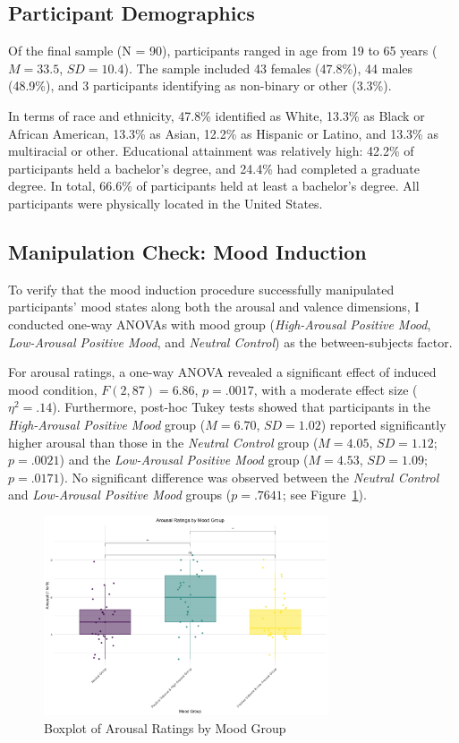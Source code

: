 \documentclass[../MA_Thesis.tex]{subfiles}
\begin{document}
\subsection*{Participant Demographics}

Of the final sample (N = 90), participants ranged in age from 19 to 65 years ($M = 33.5$, $SD = 10.4$). The sample included 43 females (47.8\%), 44 males (48.9\%), and 3 participants identifying as non-binary or other (3.3\%). 

In terms of race and ethnicity, 47.8\% identified as White, 13.3\% as Black or African American, 13.3\% as Asian, 12.2\% as Hispanic or Latino, and 13.3\% as multiracial or other. Educational attainment was relatively high: 42.2\% of participants held a bachelor’s degree, and 24.4\% had completed a graduate degree. In total, 66.6\% of participants held at least a bachelor’s degree. All participants were physically located in the United States.

\subsection*{Manipulation Check: Mood Induction}
To verify that the mood induction procedure successfully manipulated participants’ mood states along both the arousal and valence dimensions, I conducted one-way ANOVAs with mood group (\textit{High-Arousal Positive Mood}, \textit{Low-Arousal Positive Mood}, and
\textit{Neutral Control}) as the between-subjects factor.

For arousal ratings, a one-way ANOVA revealed a significant effect of induced mood condition, $F(2, 87) = 6.86$, $p = .0017$, with a moderate effect size ($\eta^2 = .14$). Furthermore, post-hoc Tukey tests showed that participants in the \textit{High-Arousal Positive Mood} group ($M = 6.70$, $SD = 1.02$) reported significantly higher arousal than those in the \textit{Neutral Control} group ($M = 4.05$, $SD = 1.12$; $p = .0021$) and the \textit{Low-Arousal Positive Mood} group ($M = 4.53$, $SD = 1.09$; $p = .0171$). No significant difference was observed between the \textit{Neutral Control} and \textit{Low-Arousal Positive Mood} groups ($p = .7641$; see Figure~\ref{fig:arousal_group}). 

\begin{figure}[H]
  \centering
  \includegraphics[width=0.75\textwidth]{../analysis/results/main_results/mood_induction_check/arousal_by_group.png}
  \caption{Boxplot of Arousal Ratings by Mood Group}
  \label{fig:arousal_group}
\end{figure}
\end{document}
